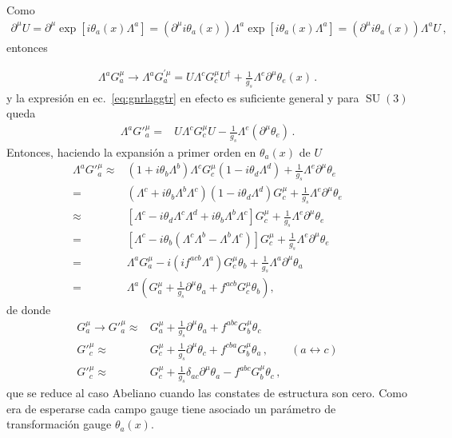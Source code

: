 Como
\begin{align}
  \partial^{\mu}U= \partial^{\mu}\exp\left[i\theta_a(x){\Lambda^a}\right]
  = \left( \partial^{\mu}i\theta_a(x)\right){\Lambda^a}\exp\left[i\theta_a(x){\Lambda^a}\right]
   = \left( \partial^{\mu}i\theta_a(x)\right){\Lambda^a}U\,,
\end{align}
entonces
\begin{frame}
\begin{align}
 \Lambda^a{G}^\mu_a\to\Lambda^a{G}^{\prime \mu}_a=U\Lambda^c{G}^\mu_c U^{\dagger}+\frac{1}{g_s}{\Lambda^e} \partial^{\mu}\theta_e(x)\,.
\end{align}
y la expresión en ec.~\eqref{eq:gnrlaggtr} en efecto es suficiente general y para $\operatorname{SU}(3)$ queda
\begin{align}
   \Lambda^a{G'}^\mu_a=&U\Lambda^cG^\mu_cU-\frac{1}{g_s}\Lambda^e(\partial^\mu\theta_e)\,.
\end{align}
Entonces, haciendo la expansión a primer orden en $\theta_{a}(x)$ de $U$
\begin{align}
\label{eq:Gmuinv}
  \Lambda^a{G'}^\mu_a\approx&(1+i\theta_b\Lambda^b)\Lambda^cG^\mu_c(1-i\theta_d\Lambda^d)+\frac{1}{g_s}\Lambda^e\partial^\mu\theta_e\nonumber\\
  =&(\Lambda^c+i\theta_b\Lambda^b\Lambda^c)(1-i\theta_d\Lambda^d)G^\mu_c+\frac{1}{g_s}\Lambda^e\partial^\mu\theta_e\nonumber\\
  \approx&[\Lambda^c-i\theta_d\Lambda^c\Lambda^d+i\theta_b\Lambda^b\Lambda^c]G^\mu_c+\frac{1}{g_s}\Lambda^e\partial^\mu\theta_e\nonumber\\
  =&[\Lambda^c-i\theta_b(\Lambda^c\Lambda^b-\Lambda^b\Lambda^c)]G^\mu_c+\frac{1}{g_s}\Lambda^e\partial^\mu\theta_e\nonumber\\
  =&\Lambda^aG^\mu_a-i(i f^{acb}\Lambda^a)G^\mu_c\theta_b+\frac{1}{g_s}\Lambda^a\partial^\mu\theta_a\nonumber\\
  =&\Lambda^a\left(G^\mu_a+\frac{1}{g_s}\partial^\mu\theta_a+f^{acb}G^\mu_c\theta_b\right),
\end{align}
de donde
\begin{align}
  \label{eq:gmutrinf}
  G^\mu_a\to {G'}^\mu_a\approx&G^\mu_a+\frac{1}{g_s}\partial^\mu\theta_a+f^{abc}G^\mu_b\theta_c\\
  {G'}^\mu_c\approx&G^\mu_c+\frac{1}{g_s}\partial^\mu\theta_c+f^{cba}G^\mu_b\theta_a\,,\qquad (a\leftrightarrow c)\nonumber\\ 
  {G'}^\mu_c\approx&G^\mu_c+\frac{1}{g_s}\delta_{ac}\partial^\mu\theta_a-f^{abc}G^\mu_b\theta_c\,,
\end{align}
que se reduce al caso Abeliano cuando las constates de estructura son cero. Como era de esperarse cada campo gauge tiene asociado un parámetro de transformación gauge $\theta_a(x)$.
\end{frame}

